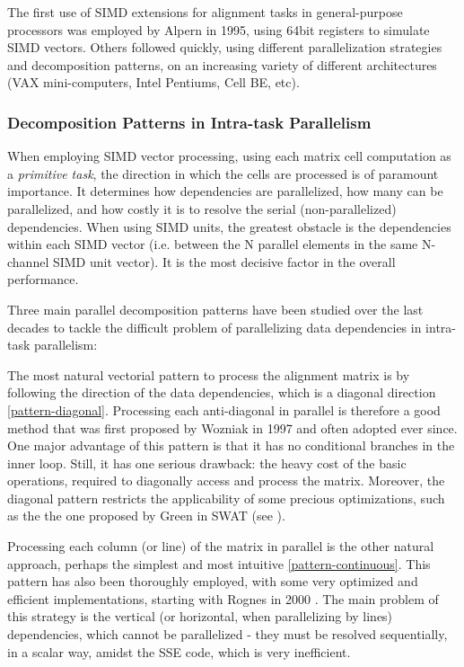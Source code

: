 The first use of SIMD extensions for alignment tasks in general-purpose processors was employed by Alpern \cite{alpern} in 1995, using 64bit registers to simulate SIMD vectors. Others followed quickly,  using different parallelization strategies and decomposition patterns, on an increasing variety of different architectures (VAX mini-computers, Intel Pentiums, Cell BE, etc).


\subsubsection{Decomposition Patterns in Intra-task Parallelism}
\label{Decomposition Patterns in Intra-task Parallelism}

When employing SIMD vector processing, using each matrix cell computation as a \emph{primitive task}, the direction in which the cells are processed is of paramount importance. It determines how dependencies are parallelized, how many can be parallelized, and how costly it is to resolve the serial (non-parallelized) dependencies. When using SIMD units, the greatest obstacle is the dependencies within each SIMD vector (i.e. between the N parallel elements in the same N-channel SIMD unit vector). It is the most decisive factor in the overall performance.

Three main parallel decomposition patterns have been studied over the last decades to tackle the difficult problem of parallelizing data dependencies in intra-task parallelism: 

\label{section-wozniak}

The most natural vectorial pattern to process the alignment matrix is by following the direction of the data dependencies, which is a diagonal direction \autoref{pattern-diagonal}. Processing each anti-diagonal in parallel is therefore a good method that was first proposed by Wozniak \cite{wozniak} in 1997 and often adopted ever since. One major advantage of this pattern is that it has no conditional branches in the inner loop. Still, it has one serious drawback: the heavy cost of the basic operations, required to diagonally access and process the matrix. Moreover, the diagonal pattern restricts the applicability of some precious optimizations, such as the the one proposed by Green in SWAT (see ).

\label{section-rognes1}
		
Processing each column (or line) of the matrix in parallel is the other natural approach, perhaps the simplest and most intuitive \autoref{pattern-continuous}. This pattern has also been thoroughly employed, with some very optimized and efficient implementations, starting with Rognes \cite{rognes2000} in 2000 . The main problem of this strategy is the vertical (or horizontal, when parallelizing by lines) dependencies, which cannot be parallelized - they must be resolved sequentially, in a scalar way, amidst the SSE code, which is very inefficient.


